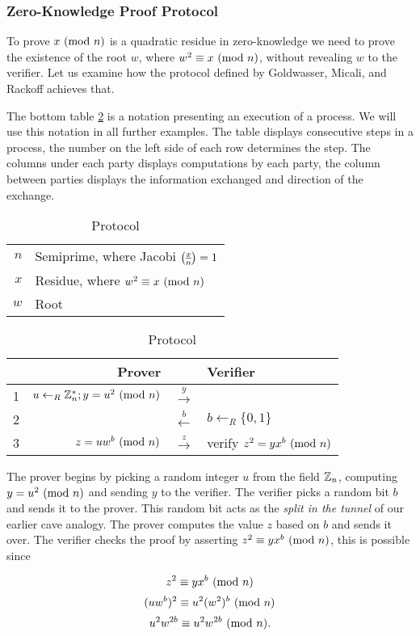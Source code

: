 \newpage
\subsubsection{Zero-Knowledge Proof Protocol}
To prove $x \ (\mathrm{mod}\ n)$ is a quadratic residue in zero-knowledge we need to prove the existence of the root $w$, where $w^2 \equiv x \ (\mathrm{mod}\ n)$, without revealing $w$ to the verifier.
Let us examine how the protocol \cite{goldwasser1989knowledge} defined by Goldwasser, Micali, and Rackoff achieves that.

\bigskip
\noindent
The bottom table \ref{table:zkp-qrp} is a notation presenting an execution of a process. We will use this notation in all further examples.
The table displays consecutive steps in a process, the number on the left side of each row determines the step.
The columns under each party displays computations by each party, the column between parties displays the information exchanged and direction of the exchange.
\bigskip
\begin{table}[h!]
	\centering
	\begin{tabular}{rl}
		$n$ & Semiprime, where Jacobi $\legendre{x}{n} = 1$\\
 		$x$ & Residue, where $w^2 \equiv x \ (\mathrm{mod}\ n)$\\
 		$w$ & Root\\
	\end{tabular}
	\caption{Protocol}
	\medskip
	\begin{tabular}{r|r|c|l}
	\label{table:zkp-qrp}
		& Prover && Verifier\\
		\hline
		1&$u \leftarrow_R \Bbb{Z}_{n}^{*}; y = u^2 \ (\mathrm{mod}\ n)$ & $\xrightarrow{y}$\\
		2 & & $\xleftarrow{b}$ & $b \leftarrow_R \{0, 1\} $\\
		3 &$z = uw^b\ (\mathrm{mod}\ n)$ & $\xrightarrow z$ & verify $z^2 = yx^b \ (\mathrm{mod}\ n)$\\
	\end{tabular}
\end{table}

\bigskip \noindent
The prover begins by picking a random integer $u$ from the field $\Bbb{Z}_{n}$, computing $y = u^2 \ (\mathrm{mod}\ n)$ and sending $y$ to the verifier.
The verifier picks a random bit $b$ and sends it to the prover. This random bit acts as the \textit{split in the tunnel} of our earlier cave analogy.
The prover computes the value $z$ based on $b$ and sends it over.
The verifier checks the proof by asserting $z^2 \equiv yx^b \ (\mathrm{mod}\ n)$, this is possible since

$$z^2 \equiv yx^b \ (\mathrm{mod}\ n)$$
$$(uw^b)^2 \equiv u^2(w^2)^b \ (\mathrm{mod}\ n)$$
$$u^2w^{2b} \equiv u^2w^{2b} \ (\mathrm{mod}\ n).$$

